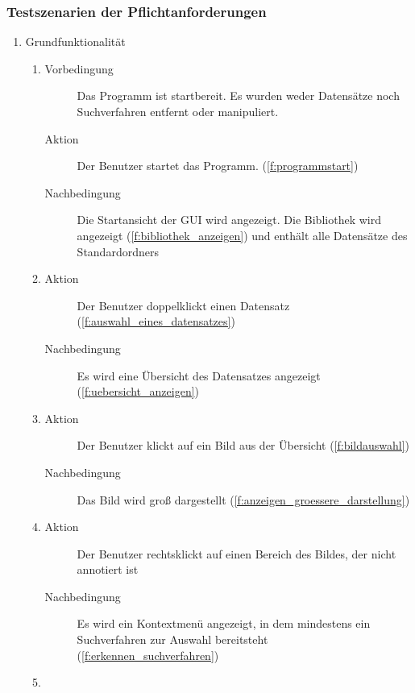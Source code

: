 \subsubsection{Testszenarien der Pflichtanforderungen}
\begin{enumerate} [label=\bfseries /TS \arabic*0/, leftmargin=*]
	\item Grundfunktionalität \label{ts:grundfunktionalitaet}
	\begin{enumerate}[leftmargin=0pt, itemindent=0pt]
		\item
		\begin{description}
			\item[Vorbedingung] Das Programm ist startbereit. Es wurden weder Datensätze noch Suchverfahren entfernt oder manipuliert.
			\item[Aktion] Der Benutzer startet das Programm. (\ref{f:programmstart})
			\item[Nachbedingung] Die Startansicht der GUI wird angezeigt. Die Bibliothek wird angezeigt (\ref{f:bibliothek_anzeigen}) und enthält alle Datensätze des Standardordners
		\end{description}
		\item
		\begin{description}
			\item[Aktion] Der Benutzer doppelklickt einen Datensatz (\ref{f:auswahl_eines_datensatzes})
			\item[Nachbedingung] Es wird eine Übersicht des Datensatzes angezeigt (\ref{f:uebersicht_anzeigen})
		\end{description}
		\item
		\begin{description}
			\item[Aktion] Der Benutzer klickt auf ein Bild aus der Übersicht (\ref{f:bildauswahl})
			\item[Nachbedingung] Das Bild wird groß dargestellt (\ref{f:anzeigen_groessere_darstellung})
		\end{description}
		\item
		\begin{description}
			\item[Aktion] Der Benutzer rechtsklickt auf einen Bereich des Bildes, der nicht annotiert ist
			\item[Nachbedingung] Es wird ein Kontextmenü angezeigt, in dem mindestens ein Suchverfahren zur Auswahl bereitsteht (\ref{f:erkennen_suchverfahren})
		\end{description}
		\item

\end{enumerate}
\end{enumerate}
